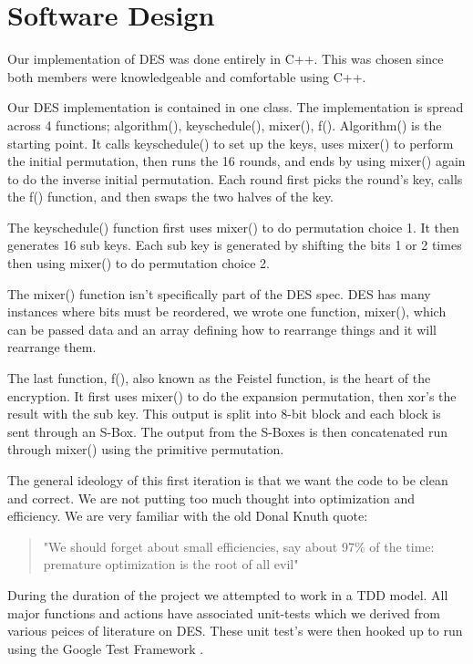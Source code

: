 \documentclass[10pt]{article}
\begin{document}
\section{Software Design}
Our implementation of DES was done entirely in C++. This was chosen since both members were knowledgeable and comfortable using C++.

Our DES implementation is contained in one class. The implementation is spread across 4 functions; algorithm(), keyschedule(), mixer(), f(). Algorithm() is the starting point. It calls keyschedule() to set up the keys, uses mixer() to perform the initial permutation, then runs the 16 rounds, and ends by using mixer() again to do the inverse initial permutation.  Each round first picks the round's key, calls the f() function, and then swaps the two halves of the key.

The keyschedule() function first uses mixer() to do permutation choice 1.  It then generates 16 sub keys.  Each sub key is generated by shifting the bits 1 or 2 times then using mixer() to do permutation choice 2.

The mixer() function isn't specifically part of the DES spec. DES has many instances where bits must be reordered, we wrote one function, mixer(), which can be passed data and an array defining how to rearrange things and it will rearrange them.

The last function, f(), also known as the Feistel function, is the heart of the encryption.  It first uses mixer() to do the expansion permutation, then xor's the result with the sub key. This output is split into 8-bit block and each block is sent through an S-Box. The output from the S-Boxes is then concatenated run through mixer() using the primitive permutation.

The general ideology of this first iteration is that we want the code to be clean and correct.
We are not putting too much thought into optimization and efficiency. We are very familiar
with the old Donal Knuth quote:


\begin{quote}
   "We should forget about small efficiencies, say about 97\% of the time: premature optimization is the root of all evil"
\end{quote}


During the duration of the project we attempted to work in a {TDD} model.
All major functions and actions have associated unit-tests which we derived from various peices of
literature on DES. These unit test's were then hooked up to run using the Google Test Framework \cite{gtest}.
\end{document}
